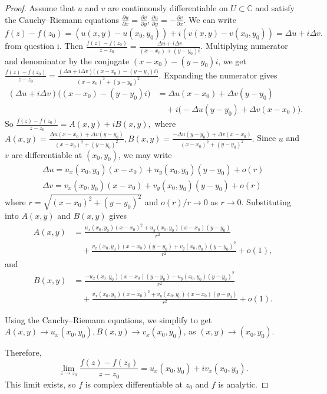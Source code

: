 \documentclass{article}
\begin{document}
\begin{proof}
Assume that $u$ and $v$ are continuously differentiable on $U\subset\mathbb{C}$ and satisfy the Cauchy--Riemann equations
$\frac{\partial u}{\partial x}=\frac{\partial v}{\partial y},
\frac{\partial u}{\partial y}=-\frac{\partial v}{\partial x}.$
We can write $f(z)-f(z_0) =(u(x,y)-u(x_0,y_0)) + i(v(x,y)-v(x_0,y_0))=\Delta u+i\Delta v.
$ from question i. Then $\frac{f(z)-f(z_0)}{z-z_0}=\frac{\Delta u+i\Delta v}{(x-x_0)+(y-y_0)i}.$ Multiplying numerator and denominator by the conjugate $(x-x_0)-(y-y_0)i$, we get
$\frac{f(z)-f(z_0)}{z-z_0}
=\frac{(\Delta u+i\Delta v)\big((x-x_0)-(y-y_0)i\big)}
{(x-x_0)^2+(y-y_0)^2}.$
Expanding the numerator gives
\begin{align*}
(\Delta u+i\Delta v)\big((x-x_0)-(y-y_0)i\big)
&=\Delta u(x-x_0)+\Delta v(y-y_0)\\
&\quad+i\big(-\Delta u(y-y_0)+\Delta v(x-x_0)\big).
\end{align*}
So $\frac{f(z)-f(z_0)}{z-z_0} = A(x,y)+iB(x,y),$ where
$ A(x,y)=\frac{\Delta u(x-x_0)+\Delta v(y-y_0)}
{(x-x_0)^2+(y-y_0)^2}, B(x,y)=\frac{-\Delta u(y-y_0)+\Delta v(x-x_0)}{(x-x_0)^2+(y-y_0)^2}.$
Since $u$ and $v$ are differentiable at $(x_0,y_0)$, we may write 
\begin{multline}
    \Delta u = u_x(x_0,y_0)(x-x_0)+u_y(x_0,y_0)(y-y_0)+o(r) \\
    \Delta v = v_x(x_0,y_0)(x-x_0)+v_y(x_0,y_0)(y-y_0)+o(r)
\end{multline}
where $r=\sqrt{(x-x_0)^2+(y-y_0)^2}$ and $o(r)/r\to0$ as $r\to0$.
Substituting into $A(x,y)$ and $B(x,y)$ gives
\begin{align*}
A(x,y)
&=\frac{u_x(x_0,y_0)(x-x_0)^2+u_y(x_0,y_0)(x-x_0)(y-y_0)}{r^2}\\
&\quad+\frac{v_x(x_0,y_0)(x-x_0)(y-y_0)+v_y(x_0,y_0)(y-y_0)^2}{r^2}
+o(1),
\end{align*}
and
\begin{align*}
B(x,y)
&=\frac{-u_x(x_0,y_0)(x-x_0)(y-y_0)-u_y(x_0,y_0)(y-y_0)^2}{r^2}\\
&\quad+\frac{v_x(x_0,y_0)(x-x_0)^2+v_y(x_0,y_0)(x-x_0)(y-y_0)}{r^2}
+o(1).
\end{align*}

Using the Cauchy--Riemann equations, we simplify to get $A(x,y)\to u_x(x_0,y_0), B(x,y)\to v_x(x_0,y_0)$, as $(x,y)\to(x_0,y_0)$.

Therefore,
\[
\lim_{z\to z_0}\frac{f(z)-f(z_0)}{z-z_0}
=u_x(x_0,y_0)+iv_x(x_0,y_0).
\]
This limit exists, so $f$ is complex differentiable at $z_0$ and $f$ is analytic. 
\end{proof}
\end{document}
